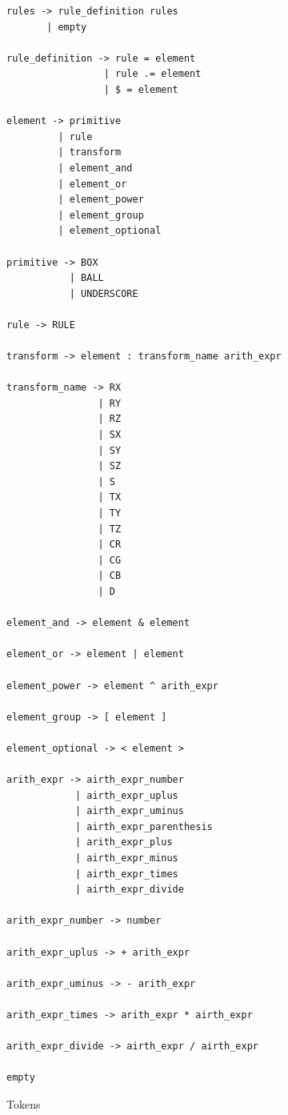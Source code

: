 \documentclass[a4paper, 10pt, twoside]{article}
\begin{document}
\begin{verbatim}
rules -> rule_definition rules
       | empty

rule_definition -> rule = element
                 | rule .= element
                 | $ = element

element -> primitive
         | rule
         | transform
         | element_and
         | element_or
         | element_power
         | element_group
         | element_optional

primitive -> BOX
           | BALL
           | UNDERSCORE

rule -> RULE

transform -> element : transform_name arith_expr

transform_name -> RX
                | RY
                | RZ
                | SX
                | SY
                | SZ
                | S
                | TX
                | TY
                | TZ
                | CR
                | CG
                | CB
                | D

element_and -> element & element

element_or -> element | element

element_power -> element ^ arith_expr

element_group -> [ element ]

element_optional -> < element >

arith_expr -> airth_expr_number
            | airth_expr_uplus
            | airth_expr_uminus
            | airth_expr_parenthesis
            | arith_expr_plus
            | airth_expr_minus
            | airth_expr_times
            | airth_expr_divide

arith_expr_number -> number

arith_expr_uplus -> + arith_expr

arith_expr_uminus -> - arith_expr

arith_expr_times -> arith_expr * airth_expr

arith_expr_divide -> airth_expr / airth_expr

empty

\end{verbatim}

Tokens
\end{document}
